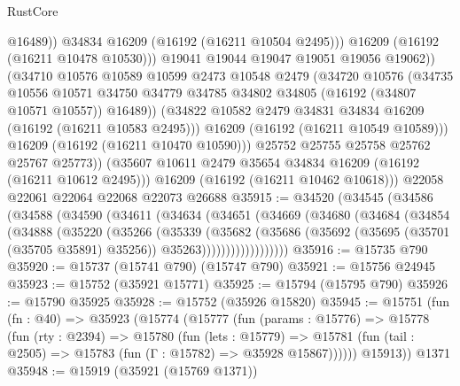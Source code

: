 \begin{lexlean}{RustCore}
\begin{coremodule}
                        @16489))
                    @34834
                    @16209
                    (@16192 (@16211 @10504 @2495)))
                  @16209
                  (@16192 (@16211 @10478 @10530)))
                @19041
                @19044
                @19047
                @19051
                @19056
                @19062))
            (@34710
              @10576
              @10589
              @10599
              @2473
              @10548
              @2479
              (@34720
                @10576
                (@34735
                  @10556
                  @10571
                  @34750
                  @34779
                  @34785
                  @34802
                  @34805
                  (@16192 (@34807 @10571 @10557))
                  @16489))
              (@34822 @10582 @2479 @34831 @34834 @16209 (@16192 (@16211 @10583 @2495)))
              @16209
              (@16192 (@16211 @10549 @10589)))
            @16209
            (@16192 (@16211 @10470 @10590)))
          @25752
          @25755
          @25758
          @25762
          @25767
          @25773))
      (@35607 @10611 @2479 @35654 @34834 @16209 (@16192 (@16211 @10612 @2495)))
      @16209
      (@16192 (@16211 @10462 @10618)))
    @22058
    @22061
    @22064
    @22068
    @22073
    @26688
@35915 := @34520
    (@34545
      (@34586
        (@34588
          (@34590
            (@34611
              (@34634
                (@34651
                  (@34669
                    (@34680
                      (@34684
                        (@34854
                          (@34888
                            (@35220
                              (@35266
                                (@35339
                                  (@35682
                                    (@35686
                                      (@35692
                                        (@35695 (@35701 (@35705 @35891) @35256))
                                        @35263))))))))))))))))))
@35916 := @15735 @790
@35920 := @15737 (@15741 @790) (@15747 @790)
@35921 := @15756 @24945
@35923 := @15752 (@35921 @15771)
@35925 := @15794 (@15795 @790)
@35926 := @15790 @35925
@35928 := @15752 (@35926 @15820)
@35945 := @15751
    (fun (fn : @40) =>
    @35923
      (@15774
        (@15777
          (fun (params : @15776) =>
          @15778
            (fun (rty : @2394) =>
            @15780
              (fun (lets : @15779) =>
              @15781 (fun (tail : @2505) => @15783 (fun (Γ : @15782) => @35928 @15867))))))
        @15913))
    @1371
@35948 := @15919 (@35921 (@15769 @1371))

\end{coremodule}
\end{lexlean}
